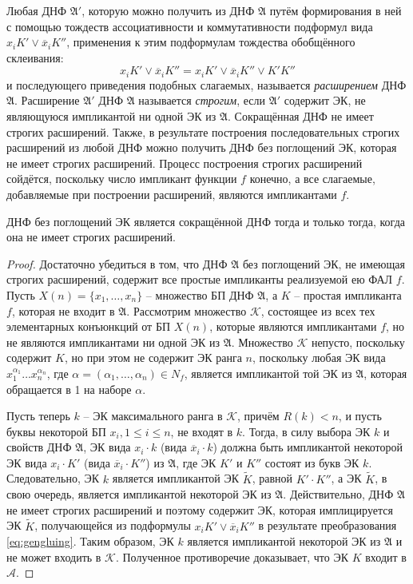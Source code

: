 \documentclass[11pt]{article}
\newcounter{th}\setcounter{th}{0}
\def\th{\par\smallskip\refstepcounter{th}\textbf{\arabic{th}}}
\newtheorem*{Theorem}{Теорема \th}
\begin{document}
Любая ДНФ \(\mathfrak{A'}\), которую можно получить из ДНФ \(\mathfrak{A}\) путём формирования в ней с помощью тождеств ассоциативности и коммутативности подформул вида \(x_iK'\lor\overline{x}_iK''\), применения к этим подформулам тождества обобщённого склеивания:
  \begin{equation}
  \label{eq:gengluing}
x_iK'\lor\overline{x}_iK'' = x_iK'\lor\overline{x}_iK''\lor K'K''
  \end{equation}
и последующего приведения подобных слагаемых, называется \emph{расширением} ДНФ \(\mathfrak{A}\). Расширение \(\mathfrak{A'}\) ДНФ \(\mathfrak{A}\) называется \emph{строгим}, если \(\mathfrak{A'}\) содержит ЭК, не являющуюся импликантой ни одной ЭК из \(\mathfrak{A}\). Сокращённая ДНФ не имеет строгих расширений. Также, в результате построения последовательных строгих расширений из любой ДНФ можно получить ДНФ без поглощений ЭК, которая не имеет строгих расширений. Процесс построения строгих расширений сойдётся, поскольку число импликант функции \(f\) конечно, а все слагаемые, добавляемые при построении расширений, являются импликантами \(f\).
\begin{Theorem}
ДНФ без поглощений ЭК является сокращённой ДНФ тогда и только тогда, когда она не имеет строгих расширений.
\end{Theorem}
\begin{proof}
Достаточно убедиться в том, что ДНФ $\mathfrak{A}$ без поглощений ЭК, не имеющая строгих расширений, содержит все простые импликанты реализуемой ею ФАЛ $f$. Пусть $X(n) = \{x_1, \ldots, x_n\}$ -- множество БП ДНФ $\mathfrak{A}$, а $K$ -- простая импликанта $f$, которая не входит в $\mathfrak{A}$. Рассмотрим множество $\mathcal{K}$, состоящее из всех тех элементарных конъюнкций от БП $X(n)$, которые являются импликантами $f$, но не являются импликантами ни одной ЭК из $\mathfrak{A}$. Множество $\mathcal{K}$ непусто, поскольку содержит $K$, но при этом не содержит ЭК ранга $n$, поскольку любая ЭК вида $x_1^{\alpha_1}\ldots x_n^{\alpha_n}$, где $\alpha = (\alpha_1, \ldots, \alpha_n) \in N_f$, является импликантой той ЭК из $\mathfrak{A}$, которая обращается в 1 на наборе $\alpha$.

Пусть теперь $k$ -- ЭК максимального ранга в $\mathcal{K}$, причём $R(k) < n$, и пусть буквы некоторой БП $x_i, 1 \leq i \leq n$, не входят в $k$. Тогда, в силу выбора ЭК $k$ и свойств ДНФ $\mathfrak{A}$, ЭК вида $x_i\cdot k$ (вида $\overline{x}_i\cdot k$) должна быть импликантой некоторой ЭК вида $x_i\cdot K'$ (вида $\overline{x}_i\cdot K''$) из $\mathfrak{A}$, где ЭК $K'$ и $K''$ состоят из букв ЭК $k$. Следовательно, ЭК $k$ является импликантой ЭК $\widetilde{K}$, равной $K'\cdot K''$, а ЭК $\widetilde{K}$, в свою очередь, является импликантой некоторой ЭК из $\mathfrak{A}$. Действительно, ДНФ $\mathfrak{A}$ не имеет строгих расширений и поэтому содержит ЭК, которая имплицируется ЭК $\widetilde{K}$, получающейся из подформулы $x_iK'\lor\overline{x}_iK''$ в результате преобразования \eqref{eq:gengluing}. Таким образом, ЭК $k$ является импликантой некоторой ЭК из $\mathfrak{A}$ и не может входить в $\mathcal{K}$. Полученное противоречие доказывает, что ЭК $K$ входит в $\mathcal{A}$.
\end{proof}
\end{document}
